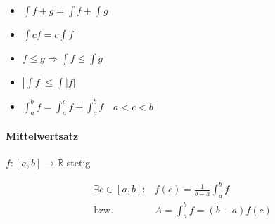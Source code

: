 \begin{itemize}
  \item $\int f + g = \int f + \int g$
  \item $\int cf = c \int f$
  \item $f \leq g \Rightarrow \int f \leq \int g$
  \item $|\int f| \leq \int |f|$
  \item $\int_{a}^{b} f = \int_{a}^{c} f + \int_{c}^{b} f \quad a < c < b$
\end{itemize}

\paragraph{Mittelwertsatz} $f: [a, b] \rightarrow \mathbb{R}$ stetig

\begin{align*}
  \exists c \in [a, b]: & f(c) = \frac{1}{b -a} \int_{a}^{b} f \\
  \text{bzw. }          & A = \int_{a}^{b} f = (b - a) f(c)
\end{align*}